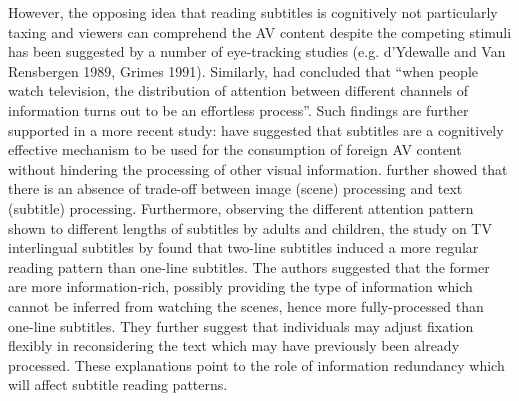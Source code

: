 \documentclass[output=paper]{langsci/langscibook}
\begin{document}
However, the opposing idea that reading subtitles is cognitively not particularly taxing and viewers can comprehend the AV content despite the competing stimuli has been suggested by a number of eye-tracking studies (e.g. d'Ydewalle and Van Rensbergen 1989, Grimes 1991). Similarly, \citet[425]{dydewalle1992} had concluded that ``when people watch television, the distribution of attention between different channels of information turns out to be an effortless process''. Such findings are further supported in a more recent study: \citet{perego2010} have suggested that subtitles are a cognitively effective mechanism to be used for the consumption of foreign AV content without hindering the processing of other visual information. \citet{perego2010} further showed that there is an absence of trade-off between image (scene) processing and text (subtitle) processing. Furthermore, observing the different attention pattern shown to different lengths of subtitles by adults and children, the study on TV interlingual subtitles by \citet{Bruycker2007} found that two-line subtitles induced a more regular reading pattern than one-line subtitles. The authors suggested that the former are more information-rich, possibly providing the type of information which cannot be inferred from watching the scenes, hence more fully-processed than one-line subtitles. They further suggest that individuals may adjust fixation flexibly in reconsidering the text which may have previously been already processed.  These explanations point to the role of information redundancy which will affect subtitle reading patterns.
\end{document}
